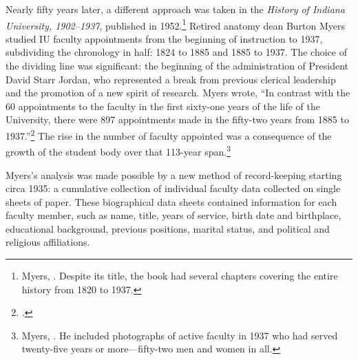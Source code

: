\documentclass[
  american,
  letterpaper,
]{scrreprt}
\begin{document}
Nearly fifty years later, a different approach was taken in the
\emph{History of Indiana University, 1902--1937}, published in
1952.\footnote{Myers, . Despite its title, the book had several chapters
  covering the entire history from 1820 to 1937.} Retired anatomy dean
Burton Myers studied IU faculty appointments from the beginning of
instruction to 1937, subdividing the chronology in half: 1824 to 1885
and 1885 to 1937. The choice of the dividing line was significant: the
beginning of the administration of President David Starr Jordan, who
represented a break from previous clerical leadership and the promotion
of a new spirit of research. Myers wrote, ``In contrast with the 60
appointments to the faculty in the first sixty-one years of the life of
the University, there were 897 appointments made in the fifty-two years
from 1885 to 1937.''\footnote{.}
The rise in the number of faculty appointed was a consequence of the
growth of the student body over that 113-year span.\footnote{Myers,
  .
  He included photographs of active faculty in 1937 who had served
  twenty-five years or more---fifty-two men and women in all.}

Myers's analysis was made possible by a new method of record-keeping
starting circa 1935: a cumulative collection of individual faculty data
collected on single sheets of paper. These biographical data sheets
contained information for each faculty member, such as name, title,
years of service, birth date and birthplace, educational background,
previous positions, marital status, and political and religious
affiliations.
\end{document}
